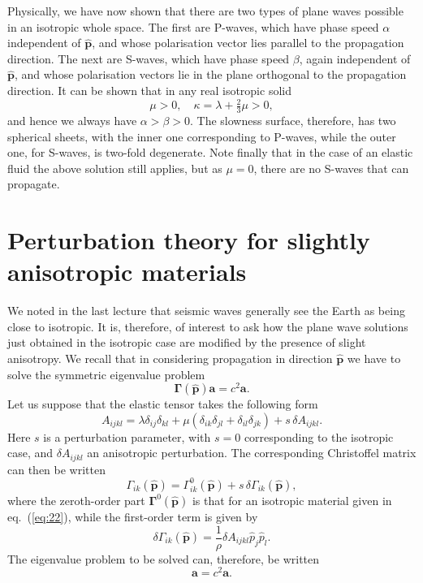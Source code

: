 Physically, we have now shown that there are two types of plane waves possible in an isotropic whole space. The first 
are P-waves, which have phase speed $\alpha$
independent of $\hat{\mathbf{p}}$, and whose polarisation vector lies parallel
to the propagation direction. The next are S-waves, which have phase speed $\beta$, again independent of $\hat{\mathbf{p}}$, and 
whose polarisation vectors lie in the plane orthogonal to the propagation direction. It can be shown
 that in any real isotropic solid
\begin{equation}
\mu>0,\quad \kappa=\lambda+\tfrac{2}{3}\mu>0,
\label{eq:28}
\end{equation}
and hence we always have $\alpha>\beta>0$. The slowness surface, therefore, has two spherical sheets, with the inner one corresponding to 
P-waves, while the outer one, for S-waves, is two-fold degenerate. Note finally that in the case of
an elastic fluid the above solution still applies, but as $\mu=0$, there are no S-waves that can propagate.

\section*{Perturbation theory for slightly anisotropic materials}

We noted in the last lecture that seismic waves generally see the Earth as being close to isotropic. It is, therefore, of interest to 
ask how the plane wave solutions just obtained in the isotropic case are modified by the presence of
 slight anisotropy. We recall that in considering propagation in direction $\hat{\mathbf{p}}$ we have to solve the symmetric eigenvalue problem
\begin{equation}
\bm{\Gamma}(\hat{\mathbf{p}})\mathbf{a}=c^{2}\mathbf{a}.
\label{eq:29}
\end{equation}
Let us suppose that the elastic tensor takes the following form
\begin{equation}
A_{ijkl}=\lambda\delta_{ij}\delta_{kl}+\mu(\delta_{ik}\delta_{jl}+\delta_{il}\delta_{jk})+s\,\delta A_{ijkl}.
\label{eq:30}
\end{equation}
Here $s$ is a perturbation parameter, with $s=0$ corresponding to the isotropic case, and $\delta A_{ijkl}$ an anisotropic perturbation. 
The corresponding Christoffel matrix can then be written
\begin{equation}
\Gamma_{ik}(\hat{\mathbf{p}})=\Gamma^{0}_{ik}(\hat{\mathbf{p}})+s\,\delta\Gamma_{ik}(\hat{\mathbf{p}}),
\label{eq:31}
\end{equation}
where the zeroth-order part $\bm{\Gamma}^{0}(\hat{\mathbf{p}})$ is that for an isotropic material given in eq.~(\ref{eq:22}), while the first-order term is given by
\begin{equation}
\delta\Gamma_{ik}(\hat{\mathbf{p}})=\frac{1}{\rho}\delta A_{ijkl}\hat{p}_{j}\hat{p}_{l}.
\label{eq:32}
\end{equation}
The eigenvalue problem to be solved can, therefore, be written
\begin{equation}
[\bm{\Gamma}^{0}(\hat{\mathbf{p}})+s\,\delta\bm{\Gamma}(\hat{\mathbf{p}})]\mathbf{a}=c^{2}\mathbf{a}.
\label{eq:33}
\end{equation}

